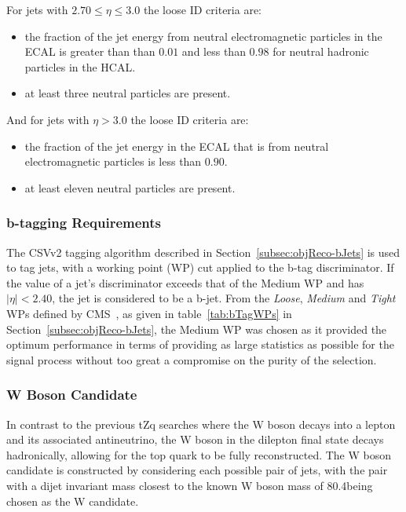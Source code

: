 For jets with $ 2.70 \leq \eta \leq 3.0$ the loose ID criteria are:
\begin{itemize}
\item the fraction of the jet energy from neutral electromagnetic particles in the ECAL is greater than than $0.01$ and less than $0.98$ for neutral hadronic particles in the HCAL.
\item at least three neutral particles are present.
\end{itemize}

And for jets with $\eta > 3.0$ the loose ID criteria are:
\begin{itemize}
\item the fraction of the jet energy in the ECAL that is from neutral electromagnetic particles is less than $0.90$.
\item at least eleven neutral particles are present.
\end{itemize}

\subsubsection{b-tagging Requirements}
The CSVv2 tagging algorithm described in Section~\ref{subsec:objReco-bJets} is used to tag jets, with a working point (WP) cut applied to the b-tag discriminator.
If the value of a jet's discriminator exceeds that of the Medium WP and has $|\eta| < 2.40$, the jet is considered to be a b-jet.
From the \emph{Loose}, \emph{Medium} and \emph{Tight} WPs defined by CMS~\cite{Sirunyan:2017ezt}, as given in table~\ref{tab:bTagWPs} in Section~\ref{subsec:objReco-bJets}, the Medium WP was chosen as it provided the optimum performance in terms of providing as large statistics as possible for the signal process without too great a compromise on the purity of the selection.

\subsubsection{W Boson Candidate}
In contrast to the previous tZq searches where the W boson decays into a lepton and its associated antineutrino, the W boson in the dilepton final state decays hadronically, allowing for the top quark to be fully reconstructed.
The W boson candidate is constructed by considering each possible pair of jets, with the pair with a dijet invariant mass closest to the known W boson mass of 80.4\GeVcc being chosen as the W candidate.

